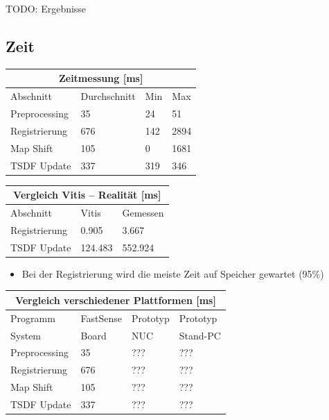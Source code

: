 \documentclass{beamer}
\begin{document}
\begin{frame}{\subsecname}
TODO: Ergebnisse
\end{frame}

\subsection{Zeit}
\begin{frame}{\subsecname}
\centering
\begin{tabular}{ |p{3cm}||p{2cm}|p{2cm}|p{2cm}|  }
 \hline
 \multicolumn{4}{|c|}{Zeitmessung [ms]} \\
 \hline
 Abschnitt      & Durchschnitt &  Min &  Max \\
 \hline
 Preprocessing  &           35 &   24 &   51 \\
 Registrierung  &          676 &  142 & 2894 \\
 Map Shift      &          105 &    0 & 1681 \\
 TSDF Update    &          337 &  319 &  346 \\
 \hline
\end{tabular}
\end{frame}

\begin{frame}{\subsecname}
\centering
\begin{tabular}{ |l||l|l|  }
 \hline
 \multicolumn{3}{|c|}{Vergleich Vitis -- Realität [ms]} \\
 \hline
 Abschnitt      & Vitis & Gemessen\\
 \hline
 Registrierung  & 0.905 & 3.667 \\
 TSDF Update    & 124.483 & 552.924 \\
 \hline
\end{tabular}
\begin{itemize}
\item{Bei der Registrierung wird die meiste Zeit auf Speicher gewartet (95\%)}
\end{itemize}
\end{frame}

\begin{frame}{\subsecname}
\centering
\begin{tabular}{ |p{3cm}||p{2cm}|p{2cm}|p{2cm}|  }
 \hline
 \multicolumn{4}{|c|}{Vergleich verschiedener Plattformen [ms]} \\
 \hline
 Programm       & FastSense & Prototyp & Prototyp \\
 \hline
 System         &     Board &    NUC   & Stand-PC \\
 \hline
 Preprocessing  &        35 &      ??? &      ??? \\
 Registrierung  &       676 &      ??? &      ??? \\
 Map Shift      &       105 &      ??? &      ??? \\
 TSDF Update    &       337 &      ??? &      ??? \\
\hline
\end{tabular}
\end{frame}
\end{document}
